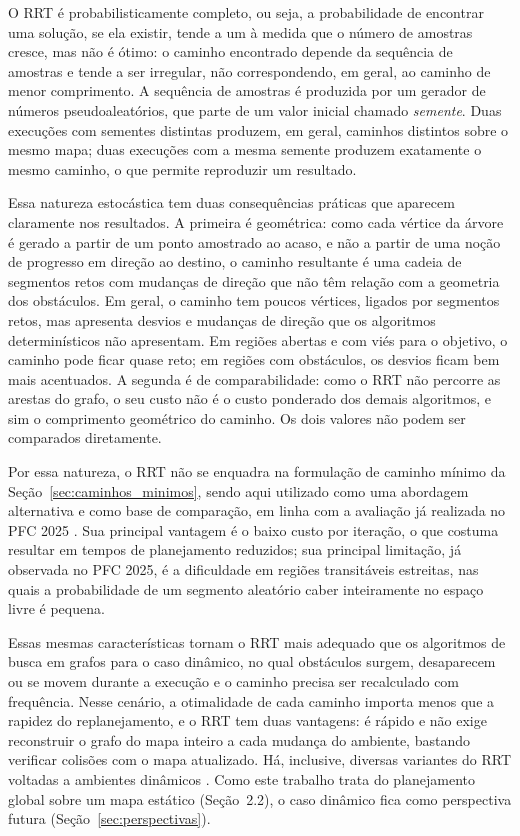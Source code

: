 \documentclass[
    12pt,
    openright,
    oneside,
    a4paper,
    english,
    brazil
]{abntex2}
\begin{document}
O RRT é probabilisticamente completo, ou seja, a probabilidade de encontrar uma solução, se ela existir, tende a um à medida que o número de amostras cresce, mas não é ótimo: o caminho encontrado depende da sequência de amostras e tende a ser irregular, não correspondendo, em geral, ao caminho de menor comprimento. A sequência de amostras é produzida por um gerador de números pseudoaleatórios, que parte de um valor inicial chamado \emph{semente}. Duas execuções com sementes distintas produzem, em geral, caminhos distintos sobre o mesmo mapa; duas execuções com a mesma semente produzem exatamente o mesmo caminho, o que permite reproduzir um resultado.

Essa natureza estocástica tem duas consequências práticas que aparecem claramente nos resultados. A primeira é geométrica: como cada vértice da árvore é gerado a partir de um ponto amostrado ao acaso, e não a partir de uma noção de progresso em direção ao destino, o caminho resultante é uma cadeia de segmentos retos com mudanças de direção que não têm relação com a geometria dos obstáculos. Em geral, o caminho tem poucos vértices, ligados por segmentos retos, mas apresenta desvios e mudanças de direção que os algoritmos determinísticos não apresentam. Em regiões abertas e com viés para o objetivo, o caminho pode ficar quase reto; em regiões com obstáculos, os desvios ficam bem mais acentuados. A segunda é de comparabilidade: como o RRT não percorre as arestas do grafo, o seu custo não é o custo ponderado dos demais algoritmos, e sim o comprimento geométrico do caminho. Os dois valores não podem ser comparados diretamente.

Por essa natureza, o RRT não se enquadra na formulação de caminho mínimo da Seção~\ref{sec:caminhos_minimos}, sendo aqui utilizado como uma abordagem alternativa e como base de comparação, em linha com a avaliação já realizada no PFC 2025 \cite{camelo2025}. Sua principal vantagem é o baixo custo por iteração, o que costuma resultar em tempos de planejamento reduzidos; sua principal limitação, já observada no PFC 2025, é a dificuldade em regiões transitáveis estreitas, nas quais a probabilidade de um segmento aleatório caber inteiramente no espaço livre é pequena.

Essas mesmas características tornam o RRT mais adequado que os algoritmos de busca em grafos para o caso dinâmico, no qual obstáculos surgem, desaparecem ou se movem durante a execução e o caminho precisa ser recalculado com frequência. Nesse cenário, a otimalidade de cada caminho importa menos que a rapidez do replanejamento, e o RRT tem duas vantagens: é rápido e não exige reconstruir o grafo do mapa inteiro a cada mudança do ambiente, bastando verificar colisões com o mapa atualizado. Há, inclusive, diversas variantes do RRT voltadas a ambientes dinâmicos \cite{xu2024}. Como este trabalho trata do planejamento global sobre um mapa estático (Seção~2.2), o caso dinâmico fica como perspectiva futura (Seção~\ref{sec:perspectivas}).
\end{document}
